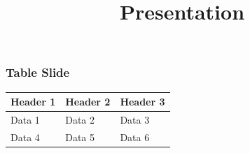\documentclass{beamer}
\title{Presentation}
\begin{document}
\begin{frame}
\frametitle{Table Slide}
\begin{tabular}{lll}
\toprule
Header 1 & Header 2 & Header 3 \\
\midrule
Data 1 & Data 2 & Data 3 \\
Data 4 & Data 5 & Data 6 \\
\bottomrule
\end{tabular}
\end{frame}
\end{document}
